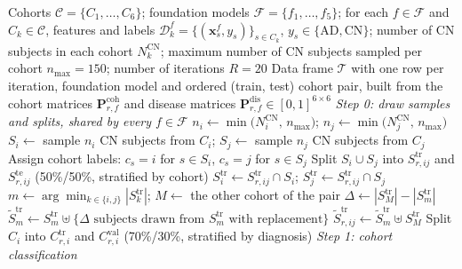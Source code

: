 \documentclass[11pt]{article}
\begin{document}
\begin{algorithm}[t]
\caption{Cohort separability and cross-cohort disease classification}
\label{alg:pipeline}
\begin{algorithmic}[1]
\Require Cohorts $\mathcal{C} = \{C_1,\dots,C_6\}$; foundation models $\mathcal{F} = \{f_1,\dots,f_5\}$;
  for each $f \in \mathcal{F}$ and $C_k \in \mathcal{C}$, features and labels
  $\mathcal{D}^{f}_{k} = \{(\mathbf{x}^{f}_{s}, y_s)\}_{s \in C_k}$, $y_s \in \{\text{AD}, \text{CN}\}$;
  number of CN subjects in each cohort $N^{\text{CN}}_{k}$;
  maximum number of CN subjects sampled per cohort $n_{\max} = 150$;
  number of iterations $R = 20$
\Ensure Data frame $\mathcal{T}$ with one row per iteration, foundation model and ordered
  (train, test) cohort pair, built from the cohort matrices $\mathbf{P}^{\text{coh}}_{r,f}$
  and disease matrices $\mathbf{P}^{\text{dis}}_{r,f} \in [0,1]^{6\times 6}$
  \Statex \hspace{\algorithmicindent}\textit{Step 0: draw samples and splits, shared by every $f \in \mathcal{F}$}
    \State $n_i \gets \min\big(N^{\text{CN}}_{i},\, n_{\max}\big)$; \;
           $n_j \gets \min\big(N^{\text{CN}}_{j},\, n_{\max}\big)$
    \State $S_i \gets$ sample $n_i$ CN subjects from $C_i$; \;
           $S_j \gets$ sample $n_j$ CN subjects from $C_j$
    \State Assign cohort labels: $c_s = i$ for $s \in S_i$, $c_s = j$ for $s \in S_j$
    \State Split $S_i \cup S_j$ into $S^{\text{tr}}_{r,ij}$ and $S^{\text{te}}_{r,ij}$ (50\%/50\%, stratified by cohort)
    \State $S^{\text{tr}}_{i} \gets S^{\text{tr}}_{r,ij} \cap S_i$; \; $S^{\text{tr}}_{j} \gets S^{\text{tr}}_{r,ij} \cap S_j$
    \State $m \gets \arg\min_{k \in \{i,j\}} |S^{\text{tr}}_{k}|$; \; $M \gets$ the other cohort of the pair
    \State $\Delta \gets |S^{\text{tr}}_{M}| - |S^{\text{tr}}_{m}|$
    \State $\tilde{S}^{\text{tr}}_{m} \gets S^{\text{tr}}_{m} \uplus \{\Delta \text{ subjects drawn from } S^{\text{tr}}_{m} \text{ with replacement}\}$
    \State $\tilde{S}^{\text{tr}}_{r,ij} \gets \tilde{S}^{\text{tr}}_{m} \uplus S^{\text{tr}}_{M}$
  \EndFor
    \State Split $C_i$ into $C^{\text{tr}}_{r,i}$ and $C^{\text{val}}_{r,i}$ (70\%/30\%, stratified by diagnosis)
  \EndFor
    \Statex \hspace{\algorithmicindent}\hspace{\algorithmicindent}\textit{Step 1: cohort classification}

\end{algorithmic}
\end{algorithm}
\end{document}

